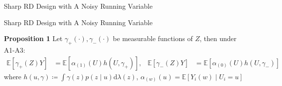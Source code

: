 \begin{frame}{Sharp RD Design with A Noisy Running Variable}
\end{frame}

\begin{frame}{Sharp RD Design with A Noisy Running Variable}
    \begin{block}{\textbf{Proposition 1}}
        \small
        Let $\gamma_{+}(\cdot),\gamma_{-}(\cdot)$ be measurable functions of $Z$, then under A1-A3:
        \begin{align*}
            \mathbb{E}\left[\gamma_{+}\left(Z\right)Y\right]&=\mathbb{E}\left[\alpha_{\left(1\right)}\left(U\right)h\left(U,\gamma_{+}\right)\right], & \mathbb{E}\left[\gamma_{-}\left(Z\right)Y\right]&=\mathbb{E}\left[\alpha_{\left(0\right)}\left(U\right)h\left(U,\gamma_{-}\right)\right]
        \end{align*}
        where $h\left(u,\gamma\right)\coloneqq\int\gamma\left(z\right)p\left(z\mid u\right)\mathrm{d}\lambda\left(z\right)$, $\alpha_{\left(w\right)}\left(u\right)=\mathbb{E}\left[Y_{i}\left(w\right)\mid U_{i}=u\right]$
    \end{block}


   
\end{frame}

